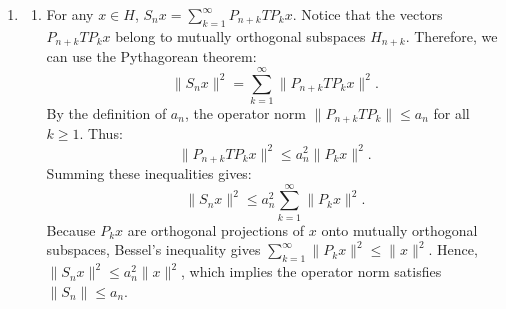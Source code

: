 \documentclass{article}
\begin{document}
\begin{enumerate}[label=\fbox{\arabic*}]
\begin{enumerate}[label=(\arabic*)]
          \item The given condition means that $\{f_m\}$ is a Cauchy sequence in $\mathcal{L}$.
          By part (1), $\|f_m - f_n\|_{L^1} \le \|f_m - f_n\|_{\mathcal{L}}$. Thus, $\{f_m\}$ is also a Cauchy sequence in $L^1(\mathbb{R})$.
          Since $L^1(\mathbb{R})$ is a Banach space, there exists a limit function $f \in L^1(\mathbb{R})$ such that $f_m \to f$ in $L^1$.
          By extracting a subsequence if necessary, we can assume that $f_m(x) \to f(x)$ pointwise almost everywhere.
          Let $\varepsilon > 0$. By the Cauchy property in $\mathcal{L}$, there exists $N$ such that for all $m, n \ge N$, $\|f_m - f_n\| < \varepsilon$.
          This means that for any $\lambda > \varepsilon$ and $m, n \ge N$,
          \[
            \int_{\mathbb{R}} \Phi\left( \frac{|f_m(x) - f_n(x)|}{\lambda} \right) \, dx \le 1.
          \]
          Fix $m \ge N$ and $\lambda > \varepsilon$. Since $\Phi$ is non-negative and continuous, we can apply Fatou's Lemma as $n \to \infty$:
          \[
            \int_{\mathbb{R}} \Phi\left( \frac{|f_m(x) - f(x)|}{\lambda} \right) \, dx \le \liminf_{n \to \infty} \int_{\mathbb{R}} \Phi\left( \frac{|f_m(x) - f_n(x)|}{\lambda} \right) \, dx \le 1.
          \]
          This implies that for $m \ge N$, $f_m - f \in \mathcal{L}$ and $\|f_m - f\| \le \lambda$.
          Since this holds for any $\lambda > \varepsilon$, we conclude that $\|f_m - f\| \le \varepsilon$ for all $m \ge N$.
          Thus, $\lim_{m \to \infty} \|f_m - f\| = 0$. Finally, since $f_N \in \mathcal{L}$ and $f - f_N \in \mathcal{L}$, by part (2) their sum $f = f_N + (f - f_N) \in \mathcal{L}$.
        \end{enumerate}

  \item %
        \begin{enumerate}[label=(\arabic*)]
          \item For any $x \in H$, $S_n x = \sum_{k=1}^\infty P_{n+k} T P_k x$.
          Notice that the vectors $P_{n+k} T P_k x$ belong to mutually orthogonal subspaces $H_{n+k}$. Therefore, we can use the Pythagorean theorem:
          \[
            \|S_n x\|^2 = \sum_{k=1}^\infty \|P_{n+k} T P_k x\|^2.
          \]
          By the definition of $a_n$, the operator norm $\|P_{n+k} T P_k\| \le a_n$ for all $k \ge 1$. Thus:
          \[
            \|P_{n+k} T P_k x\|^2 \le a_n^2 \|P_k x\|^2.
          \]
          Summing these inequalities gives:
          \[
            \|S_n x\|^2 \le a_n^2 \sum_{k=1}^\infty \|P_k x\|^2.
          \]
          Because $P_k x$ are orthogonal projections of $x$ onto mutually orthogonal subspaces, Bessel's inequality gives $\sum_{k=1}^\infty \|P_k x\|^2 \le \|x\|^2$.
          Hence, $\|S_n x\|^2 \le a_n^2 \|x\|^2$, which implies the operator norm satisfies $\|S_n\| \le a_n$.


\end{enumerate}
\end{enumerate}
\end{document}
